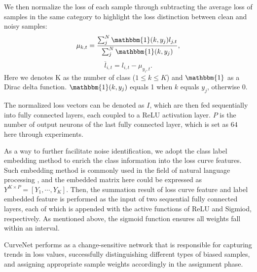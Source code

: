 \documentclass[letterpaper]{article} %
\begin{document}
We then normalize the loss of each sample through subtracting the average loss of samples in the same category to highlight the loss distinction between clean and noisy samples:
\vspace{-0.20cm} 
\begin{equation}
  \mu_{{k,t}} = \frac{\sum_j^N \mathbbm{1}(k,y_j)l_{j,t}}{\sum_j^N \mathbbm{1}(k,y_j)},
  \label{eq:mean}
\end{equation}
\vspace{-0.20cm} 
\begin{equation}
    \overline{l}_{i,t} = l_{i,t} - \mu_{y_i,t}.
    \label{eq:norm}
\end{equation}
Here we denotes K as the number of class ($1 \le k \le K$) and $\mathbbm{1}$ as a Dirac delta function.
$\mathbbm{1}(k,y_j)$ equals 1 when $k$ equals $y_j$, otherwise 0.


The normalized loss vectors can be denoted as $I$, which are then fed sequentially into fully connected layers, each coupled to a ReLU activation layer. $P$ is the number of output neurons of the last fully connected layer, which is set as $64$ here through experiments.


As a way to further facilitate noise identification, we adopt the class label embedding method to enrich the class information into the loss curve features. Such embedding method is commonly used in the field of natural language processing \cite{cao2020heteroskedastic}, and the embedded matrix here could be expressed as $Y^{K \times P} = [Y_1,\cdots,Y_K]$. 
Then, the summation result of loss curve feature and label embedded feature is performed as the input of two sequential fully connected layers, each of which is appended with the active functions of ReLU and Sigmiod, respectively. As mentioned above, the sigmoid function ensures all weights fall within an interval.


CurveNet performs as a change-sensitive network that is responsible for capturing trends in loss values, successfully distinguishing different types of biased samples, and assigning appropriate sample weights accordingly in the assignment phase.
\end{document}
